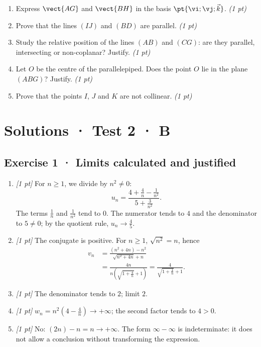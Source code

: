 \begin{enumerate}

\item Express $\vect{AG}$ and $\vect{BH}$ in the basis $\pt{\vi;\vj;\vec k}$. \hfill\textit{(1 pt)}

\item Prove that the lines $(IJ)$ and $(BD)$ are parallel. \hfill\textit{(1 pt)}

\item Study the relative position of the lines $(AB)$ and $(CG)$: are they parallel, intersecting or non-coplanar? Justify. \hfill\textit{(1 pt)}

\item Let $O$ be the centre of the parallelepiped. Does the point $O$ lie in the plane $(ABG)$? Justify. \hfill\textit{(1 pt)}

\item Prove that the points $I$, $J$ and $K$ are not collinear. \hfill\textit{(1 pt)}

\end{enumerate}

\ifmxteacher\mxnewpage

\section*{Solutions · Test 2 · B}\label{cor:2-4}

\subsection*{Exercise 1 · Limits calculated and justified}\begin{enumerate}

\item \textit{[1 pt]} For $n\ge1$, we divide by $n^2\ne0$:
\[u_n=\frac{4+\frac{4}{n}-\frac{1}{n^2}}{5+\frac{3}{n^2}}.\]
The terms $\frac{1}{n}$ and $\frac{1}{n^2}$ tend to $0$. The numerator tends to $4$ and the denominator to $5\ne0$; by the quotient rule, $u_n\to\frac{4}{5}$.

\item \textit{[1 pt]} The conjugate is positive. For $n\ge1$, $\sqrt{n^2}=n$, hence
\[\begin{aligned}v_n&=\frac{(n^2+4n)-n^2}{\sqrt{n^2+4n}+n}\\&=\frac{4n}{n(\sqrt{1+\frac{4}{n}}+1)}=\frac{4}{\sqrt{1+\frac{4}{n}}+1}.\end{aligned}\]

\item \textit{[1 pt]} The denominator tends to $2$; limit $2$.

\item \textit{[1 pt]} $w_n=n^2(4-\frac{4}{n})\to+\infty$; the second factor tends to $4>0$.

\item \textit{[1 pt]} No: $(2n)-n=n\to+\infty$. The form $\infty-\infty$ is indeterminate: it does not allow a conclusion without transforming the expression.

\end{enumerate}

